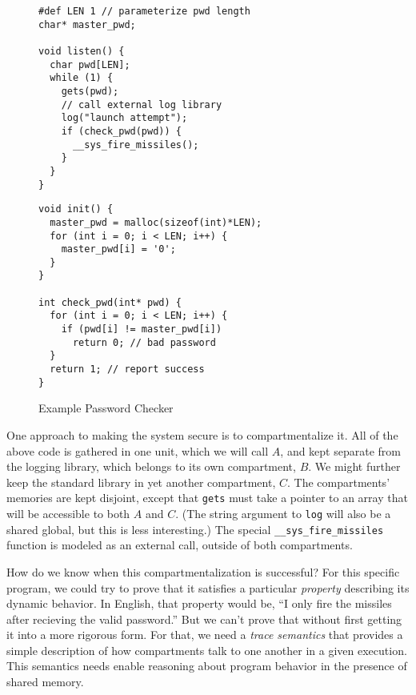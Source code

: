 \documentclass{article}
\begin{document}
\begin{figure}
  \begin{minipage}[t]{0.5\textwidth}
\begin{verbatim}
#def LEN 1 // parameterize pwd length
char* master_pwd;

void listen() {
  char pwd[LEN];
  while (1) {
    gets(pwd);
    // call external log library 
    log("launch attempt");
    if (check_pwd(pwd)) {
      __sys_fire_missiles();
    }
  }
}
\end{verbatim}
  \end{minipage}
  \begin{minipage}[t]{0.49\textwidth}
\begin{verbatim}
void init() {
  master_pwd = malloc(sizeof(int)*LEN);
  for (int i = 0; i < LEN; i++) {
    master_pwd[i] = '0';
  }
}

int check_pwd(int* pwd) {
  for (int i = 0; i < LEN; i++) {
    if (pwd[i] != master_pwd[i])
      return 0; // bad password
  }
  return 1; // report success
}
\end{verbatim}
  \end{minipage}

\caption{Example Password Checker}
\label{fig:exchecker}
\end{figure}

One approach to making the system secure is to compartmentalize it. All of the above code
is gathered in one unit, which we will call \(A\), and kept separate from the logging library,
which belongs to its own compartment, \(B\). We might further keep the standard library in yet
another compartment, \(C\). The compartments' memories are kept disjoint, except that {\tt gets}
must take a pointer to an array that will be accessible to both \(A\) and \(C\).
(The string argument to {\tt log} will also be a shared global, but this is less interesting.)
The special {\tt \_\_sys\_fire\_missiles} function is modeled as an external call,
outside of both compartments.

How do we know when this compartmentalization is successful? For this specific program,
we could try to prove that it satisfies a particular {\em property} describing its dynamic behavior.
In English, that property would be, ``I only fire the missiles after recieving the valid password.''
But we can't prove that without first getting it into a more rigorous form. For that, we
need a {\em trace semantics} that provides a simple description of how compartments talk to
one another in a given execution. This semantics needs enable reasoning about program behavior
in the presence of shared memory.
\end{document}
